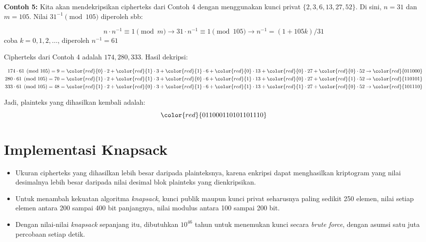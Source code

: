 \documentclass{article}
\begin{document}
\newpage


\textbf{Contoh 5:} Kita akan mendekripsikan cipherteks dari Contoh 4 dengan menggunakan kunci privat $\{2, 3, 6, 13, 27, 52\}$. Di sini, $n = 31$ dan $m = 105$. Nilai $31^{-1} \pmod{105}$ diperoleh sbb:

\[ n \cdot n^{-1} \equiv 1 \pmod{m} \rightarrow 31 \cdot n^{-1} \equiv 1 \pmod{105} \rightarrow n^{-1} = (1 + 105k)/31 \]
coba $k = 0, 1, 2, \dots$, diperoleh $n^{-1} = 61$

Cipherteks dari Contoh 4 adalah $174, 280, 333$. Hasil dekripsi:

\begin{align*}
174 \cdot 61 \pmod{105} = 9 &= \color{red}{0} \cdot 2 + \color{red}{1} \cdot 3 + \color{red}{1} \cdot 6 + \color{red}{0} \cdot 13 + \color{red}{0} \cdot 27 + \color{red}{0} \cdot 52 \rightarrow \color{red}{011000} \\
280 \cdot 61 \pmod{105} = 70 &= \color{red}{1} \cdot 2 + \color{red}{1} \cdot 3 + \color{red}{0} \cdot 6 + \color{red}{1} \cdot 13 + \color{red}{0} \cdot 27 + \color{red}{1} \cdot 52 \rightarrow \color{red}{110101} \\
333 \cdot 61 \pmod{105} = 48 &= \color{red}{1} \cdot 2 + \color{red}{0} \cdot 3 + \color{red}{1} \cdot 6 + \color{red}{1} \cdot 13 + \color{red}{1} \cdot 27 + \color{red}{0} \cdot 52 \rightarrow \color{red}{101110} 
\end{align*}

Jadi, plainteks yang dihasilkan kembali adalah:
\[ \color{red}{011000110101101110} \]

\newpage


\section*{Implementasi Knapsack}

\begin{itemize}
    \item Ukuran cipherteks yang dihasilkan lebih besar daripada plainteksnya, karena enkripsi dapat menghasilkan kriptogram yang nilai desimalnya lebih besar daripada nilai desimal blok plainteks yang dienkripsikan.
    \item Untuk menambah kekuatan algoritma \textit{knapsack}, kunci publik maupun kunci privat seharusnya paling sedikit 250 elemen, nilai setiap elemen antara 200 sampai 400 bit panjangnya, nilai modulus antara 100 sampai 200 bit.
    \item Dengan nilai-nilai \textit{knapsack} sepanjang itu, dibutuhkan $10^{46}$ tahun untuk menemukan kunci secara \textit{brute force}, dengan asumsi satu juta percobaan setiap detik.
\end{itemize}
\end{document}
